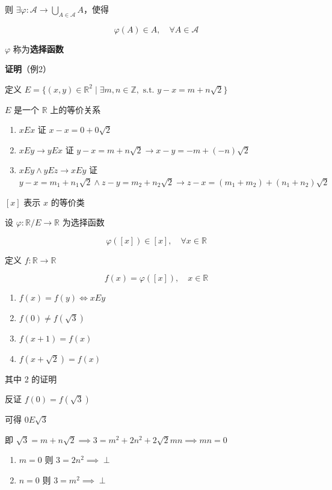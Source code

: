 则
\(\exists \varphi: \mathscr{A} \to \bigcup_{A\in \mathscr{A}}A\)，使得

\[
\varphi(A)\in A, \quad \forall A \in \mathscr{A}
\]

\(\varphi\) 称为\textbf{选择函数}

\textbf{证明}（例2）

定义
\(E = \{ (x, y)\in \mathbb{R}^{2} \mid \exists m,n\in \mathbb{Z}, \text{ s.t. } y-x=m+n\sqrt{ 2 } \}\)

\(E\) 是一个 \(\mathbb{R}\) 上的等价关系

\begin{enumerate}
\def\labelenumi{\arabic{enumi}.}
\tightlist
\item
  \(xEx\) 证 \(x-x=0+0\sqrt{ 2 }\)
\item
  \(xEy\to yEx\) 证 \(y-x=m+n\sqrt{ 2 }\to x-y=-m +(-n)\sqrt{ 2 }\)
\item
  \(xEy \wedge yEz \to xEy\) 证
  \(y-x=m_{1}+n_{1}\sqrt{ 2 } \wedge z-y=m_{2}+n_{2}\sqrt{ 2 }\to z-x=(m_{1}+m_{2})+(n_{1}+n_{2})\sqrt{ 2 }\)
\end{enumerate}

\([x]\) 表示 \(x\) 的等价类

设 \(\varphi:\mathbb{R} / E \to \mathbb{R}\) 为选择函数

\[
\varphi([x])\in [x], \quad \forall x \in \mathbb{R}
\]

定义 \(f:\mathbb{R}\to \mathbb{R}\)

\[
f(x)=\varphi([x]), \quad x \in \mathbb{R}
\]

\begin{enumerate}
\def\labelenumi{\arabic{enumi}.}
\tightlist
\item
  \(f(x)=f(y) \Leftrightarrow xEy\)
\item
  \(f(0)\neq f(\sqrt{3})\)
\item
  \(f(x+1)=f(x)\)
\item
  \(f(x+\sqrt{ 2 })=f(x)\)
\end{enumerate}

其中 2 的证明

反证 \(f(0)=f(\sqrt{ 3 })\)

可得 \(0E\sqrt{ 3 }\)

即
\(\sqrt{ 3 }=m+n\sqrt{ 2 } \implies 3=m^{2}+2n^{2}+2\sqrt{ 2 }mn\implies mn=0\)

\begin{enumerate}
\def\labelenumi{\arabic{enumi}.}
\tightlist
\item
  \(m=0\) 则 \(3=2n^{2}\implies \perp\)
\item
  \(n=0\) 则 \(3=m^{2}\implies \perp\)
\end{enumerate}

